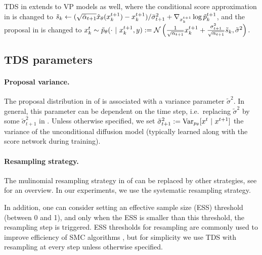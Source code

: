TDS in  extends to VP models as well,
where the conditional score approximation in  
is changed to  
$\tilde s_k \leftarrow (\sqrt{\bar \alpha_{t+1} }{\hat x}_\theta(x^{t+1}_k) - x^{t+1}_k)/\bar \sigma_{t+1}^2 + \nabla_{x^{t+1}_k} \log \tilde p_k^{t+1}$, 
and the proposal in  is changed to 
$x^{t}_k \sim \tilde p_\theta (\cdot ~\vert~ x^{t+1}_k, y) :=\mathcal{N}\left(\frac{1}{\sqrt{\alpha_{t+1}}}x^{t+1}_k + \frac{\sigma_{t+1}^2}{\sqrt{\alpha_{t+1}}} \tilde s_k, \tilde \sigma^2 \right).$


\subsection{TDS parameters}\label{sec:TDS_hyperparams}
\paragraph{Proposal variance.}
The proposal distribution in   of  is associated with a variance parameter $\tilde \sigma^2$.
In general, this parameter can be dependent on the time step, i.e.\ replacing $\tilde \sigma^2$ 
 by some $\tilde \sigma_{t+1}^2$ in . 
Unless otherwise specified, we set $\tilde \sigma_{t+1}^2:=\mathrm{Var}_{p_{\theta}}[x^{t} ~\vert~ x^{t+1}]$ the variance of the unconditional diffusion model (typically learned along with the score network during training). 

\paragraph{Resampling strategy.} The mulinomial resampling strategy in  of  can be replaced by other strategies, see \cite[Chapter 2]{naesseth2019elements} for an overview.
In our experiments, we use the systematic resampling strategy.

In addition, one can consider setting an effective sample size (ESS) threshold (between 0 and 1), and only when the ESS is smaller than this threshold, the resampling step is triggered. 
ESS thresholds for resampling are commonly used to improve efficiency of SMC algorithms \citep[see e.g.][Chapter 2.2.2]{naesseth2019elements},
but for simplicity we use TDS with resampling at every step unless otherwise specified.


